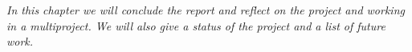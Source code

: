 \emph{In this chapter we will conclude the report and reflect on the project and working in a multiproject. We will also give a status of the project and a list of future work.} 